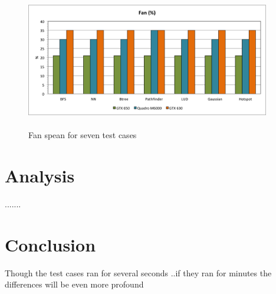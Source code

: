\documentclass[paper=a4, fontsize=11pt]{scrartcl}
\numberwithin{equation}{section}		%
\numberwithin{figure}{section}			%
\numberwithin{table}{section}				%
\begin{document}
\begin{figure}[!h]
\centering
\includegraphics[width=0.95\textwidth,height=6cm]{../imgs/fan.png}
\caption{Fan spean for seven test cases}
\label{Fan spean for seven test cases}
\end{figure}


\newpage
\section{Analysis}
.......

\newpage
\section{Conclusion}

Though the test cases ran for several seconds ..if they ran for minutes the differences will be even more profound
\end{document}

